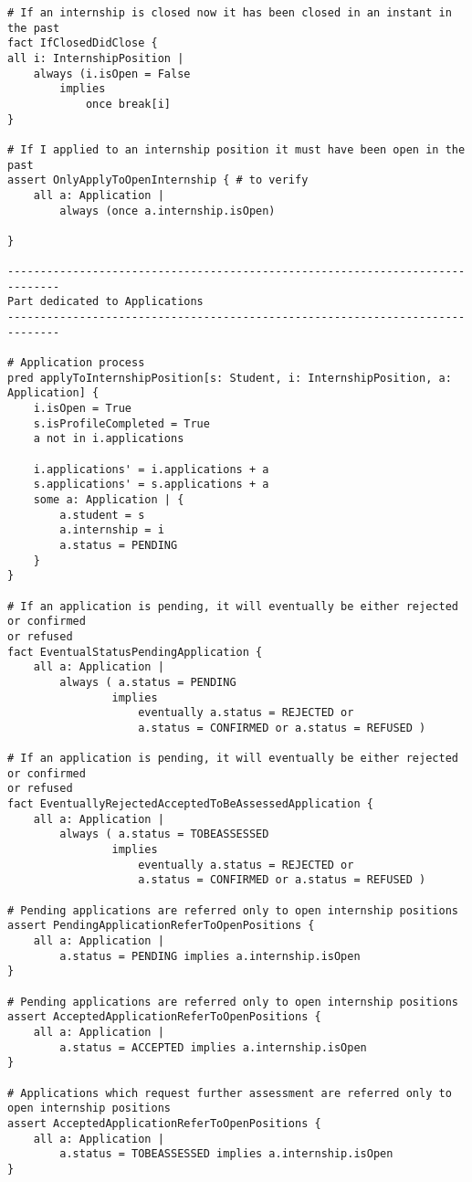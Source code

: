 \begin{verbatim}
# If an internship is closed now it has been closed in an instant in the past
fact IfClosedDidClose {
all i: InternshipPosition |
    always (i.isOpen = False
        implies 
            once break[i]
}

# If I applied to an internship position it must have been open in the past
assert OnlyApplyToOpenInternship { # to verify
    all a: Application | 
        always (once a.internship.isOpen)
        
}

------------------------------------------------------------------------------
Part dedicated to Applications
------------------------------------------------------------------------------

# Application process
pred applyToInternshipPosition[s: Student, i: InternshipPosition, a: Application] {
    i.isOpen = True                         
    s.isProfileCompleted = True              
    a not in i.applications
    
    i.applications' = i.applications + a 
    s.applications' = s.applications + a 
    some a: Application | {                  
        a.student = s                         
        a.internship = i                      
        a.status = PENDING                      
    }
}

# If an application is pending, it will eventually be either rejected or confirmed
or refused
fact EventualStatusPendingApplication {
    all a: Application | 
        always ( a.status = PENDING
                implies 
                    eventually a.status = REJECTED or 
                    a.status = CONFIRMED or a.status = REFUSED )

# If an application is pending, it will eventually be either rejected or confirmed
or refused
fact EventuallyRejectedAcceptedToBeAssessedApplication {
    all a: Application | 
        always ( a.status = TOBEASSESSED
                implies 
                    eventually a.status = REJECTED or 
                    a.status = CONFIRMED or a.status = REFUSED )

# Pending applications are referred only to open internship positions
assert PendingApplicationReferToOpenPositions {
    all a: Application | 
        a.status = PENDING implies a.internship.isOpen
}

# Pending applications are referred only to open internship positions
assert AcceptedApplicationReferToOpenPositions {
    all a: Application | 
        a.status = ACCEPTED implies a.internship.isOpen
}

# Applications which request further assessment are referred only to open internship positions
assert AcceptedApplicationReferToOpenPositions {
    all a: Application | 
        a.status = TOBEASSESSED implies a.internship.isOpen
}

\end{verbatim}
